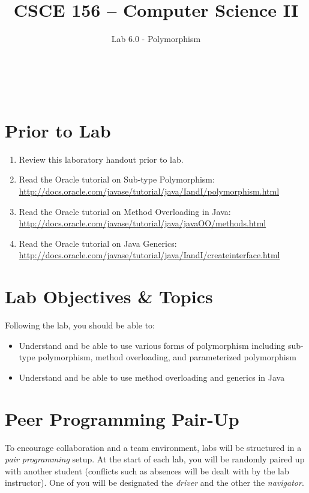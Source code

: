\documentclass[12pt]{scrartcl}
\title{CSCE 156 -- Computer Science II}
\subtitle{Lab 6.0 - Polymorphism}
\author{~}
\date{~}
\begin{document}
\maketitle

\section*{Prior to Lab}

\begin{enumerate}
  \item Review this laboratory handout prior to lab.
  \item Read the Oracle tutorial on Sub-type Polymorphism: \\
	\url{http://docs.oracle.com/javase/tutorial/java/IandI/polymorphism.html}
  \item Read the Oracle tutorial on Method Overloading in Java: \\
	\url{http://docs.oracle.com/javase/tutorial/java/javaOO/methods.html}
  \item Read the Oracle tutorial on Java Generics: \\
  \url{http://docs.oracle.com/javase/tutorial/java/IandI/createinterface.html}
\end{enumerate}

\section*{Lab Objectives \& Topics}
Following the lab, you should be able to:
\begin{itemize}
  \item Understand and be able to use various forms of polymorphism 
  	including sub-type polymorphism, method overloading, and 
	parameterized polymorphism
  \item Understand and be able to use method overloading and generics 
	in Java
\end{itemize}


\section*{Peer Programming Pair-Up}

To encourage collaboration and a team environment, labs will be
structured in a \emph{pair programming} setup.  At the start of
each lab, you will be randomly paired up with another student 
(conflicts such as absences will be dealt with by the lab instructor).
One of you will be designated the \emph{driver} and the other
the \emph{navigator}.  
\end{document}
